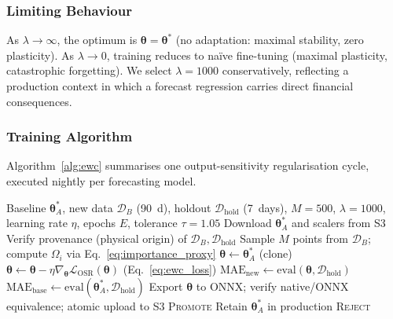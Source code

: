 \documentclass[journal]{IEEEtran}
\newcommand{\loss}{\mathcal{L}}
\newcommand{\params}{\bm{\theta}}
\newcommand{\paramsstar}{\bm{\theta}^{*}}
\newcommand{\ewclambda}{\lambda}
\begin{document}
\subsubsection{Limiting Behaviour}

As $\ewclambda \to \infty$, the optimum is $\params = \paramsstar$
(no adaptation: maximal stability, zero plasticity). As
$\ewclambda \to 0$, training reduces to na\"ive fine-tuning (maximal
plasticity, catastrophic forgetting). We select $\ewclambda = 1000$
conservatively, reflecting a production context in which a forecast
regression carries direct financial consequences.

\subsubsection{Training Algorithm}

Algorithm~\ref{alg:ewc} summarises one output-sensitivity regularisation
cycle, executed nightly per forecasting model.

\begin{algorithm}[t]
\caption{Output-Sensitivity Regularisation Cycle (per model, nightly)}
\label{alg:ewc}
\begin{algorithmic}[1]
\REQUIRE Baseline $\params_A^*$, new data $\mathcal{D}_B$ (90~d),
holdout $\mathcal{D}_{\mathrm{hold}}$ (7~days), $M{=}500$,
$\ewclambda{=}1000$, learning rate $\eta$, epochs $E$, tolerance $\tau{=}1.05$
\STATE Download $\params_A^*$ and scalers from S3
\STATE Verify provenance (physical origin) of
$\mathcal{D}_B,\mathcal{D}_{\mathrm{hold}}$
\STATE Sample $M$ points from $\mathcal{D}_B$; compute $\Omega_i$
via Eq.~\eqref{eq:importance_proxy}
\STATE $\params \leftarrow \params_A^*$ \hfill (clone)
        \STATE $\params \leftarrow \params - \eta \nabla_{\params}
        \loss_{\mathrm{OSR}}(\params)$ \hfill (Eq.~\eqref{eq:ewc_loss})
    \ENDFOR
\ENDFOR
\STATE $\mathrm{MAE}_{\mathrm{new}} \leftarrow \mathrm{eval}(\params, \mathcal{D}_{\mathrm{hold}})$
\STATE $\mathrm{MAE}_{\mathrm{base}} \leftarrow \mathrm{eval}(\params_A^*, \mathcal{D}_{\mathrm{hold}})$
    \STATE Export $\params$ to ONNX; verify native/ONNX equivalence;
    atomic upload to S3 \algorithmicreturn{} \textsc{Promote}
\ELSE
    \STATE Retain $\params_A^*$ in production \algorithmicreturn{} \textsc{Reject}
\ENDIF
\end{algorithmic}
\end{algorithm}
\end{document}
